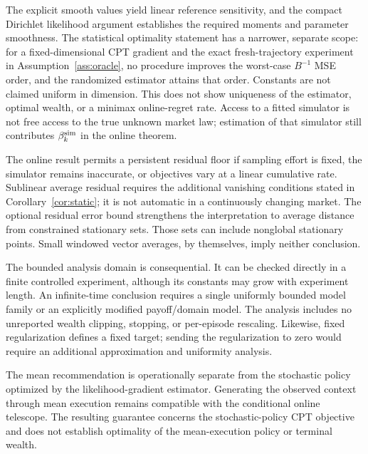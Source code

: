 \documentclass[11pt]{article}
\newcommand{\1}{\mathbf 1}
\begin{document}
The explicit smooth values yield linear reference sensitivity, and the compact Dirichlet likelihood argument establishes the required moments and parameter smoothness. The statistical optimality statement has a narrower, separate scope: for a fixed-dimensional CPT gradient and the exact fresh-trajectory experiment in Assumption~\ref{ass:oracle}, no procedure improves the worst-case $B^{-1}$ MSE order, and the randomized estimator attains that order. Constants are not claimed uniform in dimension. This does not show uniqueness of the estimator, optimal wealth, or a minimax online-regret rate. Access to a fitted simulator is not free access to the true unknown market law; estimation of that simulator still contributes $\beta_k^{\rm sim}$ in the online theorem.

The online result permits a persistent residual floor if sampling effort is fixed, the simulator remains inaccurate, or objectives vary at a linear cumulative rate. Sublinear average residual requires the additional vanishing conditions stated in Corollary~\ref{cor:static}; it is not automatic in a continuously changing market. The optional residual error bound strengthens the interpretation to average distance from constrained stationary sets. Those sets can include nonglobal stationary points. Small windowed vector averages, by themselves, imply neither conclusion.

The bounded analysis domain is consequential. It can be checked directly in a finite controlled experiment, although its constants may grow with experiment length. An infinite-time conclusion requires a single uniformly bounded model family or an explicitly modified payoff/domain model. The analysis includes no unreported wealth clipping, stopping, or per-episode rescaling. Likewise, fixed regularization defines a fixed target; sending the regularization to zero would require an additional approximation and uniformity analysis.

The mean recommendation is operationally separate from the stochastic policy optimized by the likelihood-gradient estimator. Generating the observed context through mean execution remains compatible with the conditional online telescope. The resulting guarantee concerns the stochastic-policy CPT objective and does not establish optimality of the mean-execution policy or terminal wealth.
\end{document}
